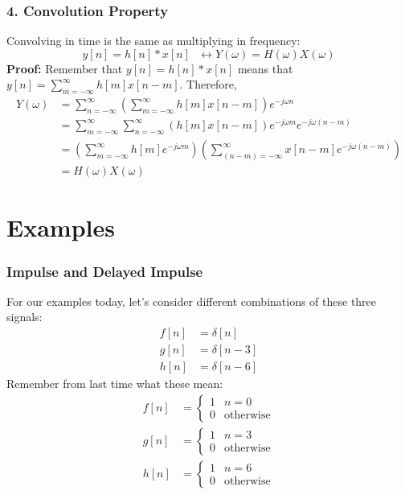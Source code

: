\documentclass{beamer}
\begin{document}
\begin{frame}
  \frametitle{4. Convolution Property}

  Convolving in time is the same as multiplying in frequency:
  \[
  y[n]=h[n]\ast x[n]~~~\leftrightarrow
  Y(\omega)=H(\omega)X(\omega)
  \]
  {\bf Proof:}
  Remember that $y[n]=h[n]\ast x[n]$ means that $y[n]=\sum_{m=-\infty}^\infty h[m]x[n-m]$.  Therefore,
  \begin{align*}
    Y(\omega) &= \sum_{n=-\infty}^{\infty}\left(\sum_{m=-\infty}^\infty h[m]x[n-m]\right)e^{-j\omega n}\\
    &= \sum_{m=-\infty}^{\infty}\sum_{n=-\infty}^\infty\left(h[m]x[n-m]\right)e^{-j\omega m}e^{-j\omega (n-m)}\\
    &= \left(\sum_{m=-\infty}^{\infty}h[m]e^{-j\omega m}\right)
    \left(\sum_{(n-m)=-\infty}^\infty  x[n-m]e^{-j\omega (n-m)}\right)\\
    &= H(\omega)X(\omega)
  \end{align*}
\end{frame}

\section[Examples]{Examples}
\setcounter{subsection}{1}

\begin{frame}
  \frametitle{Impulse and Delayed Impulse}

  For our  examples today, let's consider different combinations of these three signals:
  \begin{align*}
    f[n] &= \delta[n]\\
    g[n] &= \delta[n-3]\\
    h[n] &= \delta[n-6]
  \end{align*}
  Remember from last time what these mean:
  \begin{align*}
    f[n] &= \begin{cases}1&n=0\\0&\mbox{otherwise}\end{cases}\\
    g[n] &= \begin{cases}1&n=3\\0&\mbox{otherwise}\end{cases}\\
    h[n] &= \begin{cases}1&n=6\\0&\mbox{otherwise}\end{cases}\\
  \end{align*}
\end{frame}
\end{document}

